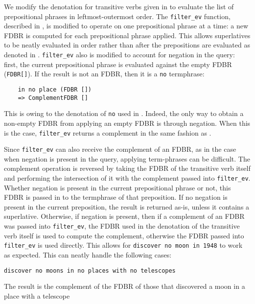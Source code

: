 \documentclass[../main.tex]{subfiles}
\begin{document}
\begin{refsection}
We modify the denotation for transitive verbs given in \cite{peelar2020webistjournal} to evaluate the list of prepositional phrases in leftmost-outermost order.  The \texttt{filter\_ev} function, described in \cite{peelar2016accommodating}, is modified to operate on one prepositional phrase at a time: a new FDBR is computed for each prepositional phrase applied.  This allows superlatives to be neatly evaluated in order rather than after the prepositions are evaluated as denoted in \cite{frostpeelar2019}.  \texttt{filter\_ev} also is modified to account for negation in the query: first, the current prepositional phrase is evaluated against the empty FDBR (\texttt{FDBR[]}).  If the result is not an FDBR, then it is a \texttt{no} termphrase:
\begin{small}
	\begin{verbatim}
    in no place (FDBR [])
    => ComplementFDBR []
	\end{verbatim}
\end{small}
This is owing to the denotation of \texttt{no} used in .  Indeed, the only way to obtain a non-empty FDBR from applying an empty FDBR is through negation.  When this is the case, \texttt{filter\_ev} returns a complement in the same fashion as \cite{frostboulos2002}.

Since \texttt{filter\_ev} can also receive the complement of an FDBR, as in the case when negation is present in the query, applying term-phrases can be difficult.  The complement operation is reversed by taking the FDBR of the transitive verb itself and performing the intersection of it with the complement passed into \texttt{filter\_ev}.  Whether negation is present in the current prepositional phrase or not, this FDBR is passed in to the termphrase of that preposition.  If no negation is present in the current preposition, the result is returned as-is, unless it contains a superlative.  Otherwise, if negation is present, then if a complement of an FDBR was passed into \texttt{filter\_ev}, the FDBR used in the denotation of the transitive verb itself is used to compute the complement, otherwise the FDBR passed into \texttt{filter\_ev} is used directly. This allows for \texttt{discover no moon in 1948} to work as expected. This can neatly handle the following cases:

\examplespacing

\texttt{discover no moons in no places with no telescopes}

\examplespacing

\noindent The result is the complement of the FDBR of those that discovered a moon in a place with a telescope


\end{refsection}
\end{document}

